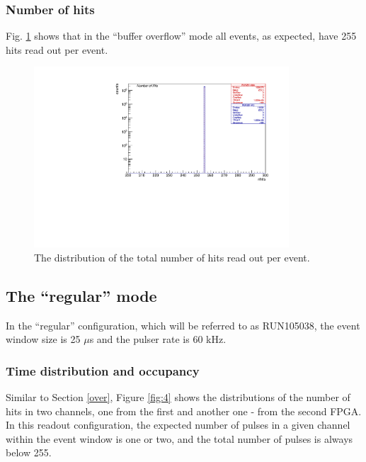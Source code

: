 \subsubsection{Number of hits}
Fig. \ref{fig:3} shows that in the ``buffer overflow'' mode all events,
as expected, have 255 hits read out per event.

\begin{figure}[!h]
\centering
\includegraphics[width =0.85\textwidth]{figures/pdf/figure_00008_nhits_281.pdf}
\caption{
  The distribution of the total number of hits read out per event.
}
\label{fig:3}
\end{figure}
\subsection{The ``regular'' mode }
In the ``regular'' configuration, which will be referred to as RUN105038, the event window size is 25 $\mu$s
and the pulser rate is 60 kHz.

\subsubsection{Time distribution and occupancy}

Similar to Section \ref{over}, Figure \ref{fig:4} shows the distributions
of the number of hits in two channels, one from the 
first and another one - from the second FPGA. 
In this readout configuration, the expected number of pulses in a given channel
within the event window is one or two, and the total number of pulses is always below 255.

